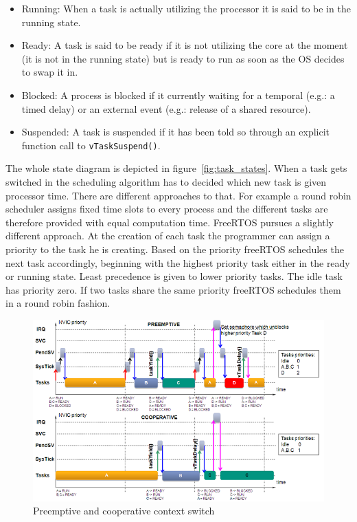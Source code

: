 \begin{itemize}
    \item Running: When a task is actually utilizing the processor it is said to be in the running state.
    \item Ready: A task is said to be ready if it is not utilizing the core at the moment (it is not in the running state) but is ready to run as soon as the OS decides to swap it in.
    \item Blocked: A process is blocked if it currently waiting for a temporal (e.g.: a timed delay) or an external event (e.g.: release of a shared resource).
    \item Suspended: A task is suspended if it has been told so through an explicit function call to \verb+vTaskSuspend()+.
\end{itemize}

The whole state diagram is depicted in figure~\ref{fig:task_states}. When a task gets switched in the scheduling algorithm has to decided which new task is given processor time. There are different approaches to that. For example a round robin scheduler assigns fixed time slots to every process and the different tasks are therefore provided with equal computation time. FreeRTOS pursues a slightly different approach. At the creation of each task the programmer can assign a priority to the task he is creating. Based on the priority freeRTOS schedules the next task accordingly, beginning with the highest priority task either in the ready or running state. Least precedence is given to lower priority tasks. The idle task has priority zero. If two tasks share the same priority freeRTOS schedules them in a round robin fashion.

\begin{figure}[htbp]
 \centering
 \includegraphics[width=\linewidth]{./figures/preemptive_cooperative.png}
 \caption{Preemptive and cooperative context switch}
 \label{fig:context_switch}
\end{figure}


